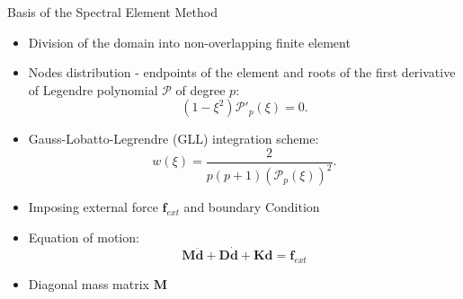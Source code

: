\documentclass[10pt]{beamer} %
\begin{document}
\begin{frame}[label=frame7]{Basis of the Spectral Element Method}
	\begin{itemize}
		\item Division of the domain into non-overlapping finite element
		\item Nodes distribution - endpoints of the element and roots of the first derivative of Legendre polynomial \(\mathcal{P}\) of degree \(p\):
		\begin{equation*}
			(1-\xi^2)\mathcal{P}'_{p}(\xi)=0.
			\label{eq:nodes}
		\end{equation*}
		\item Gauss-Lobatto-Legrendre (GLL) integration scheme:
		\begin{equation*}
			{w(\xi)} = \frac{2}{p(p+1)(\mathcal{P}_{p}(\xi))^2}.
			\label{eq:weight}
		\end{equation*}
		\item Imposing external force $\textbf{f}_{ext}$ and boundary Condition
		\item Equation of motion:
		\begin{equation*}
			\label{eq:motion}
			\textbf{M} \ddot{\textbf{d}} + \textbf{D} \dot{\textbf{d}} + \textbf{K} \textbf{d} = \textbf{f}_{ext}
		\end{equation*}
		\item Diagonal mass matrix $\textbf{M}$
	\end{itemize}
\end{frame}
\end{document}
